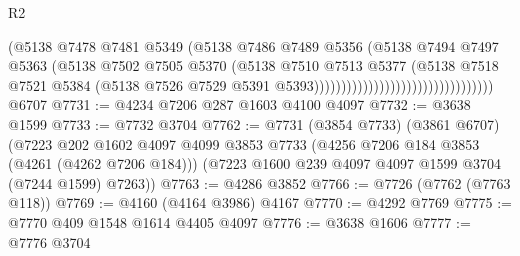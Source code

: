 \begin{lexlean}{R2}
\begin{coremodule}
                                                        (@5138
                                                          @7478
                                                          @7481
                                                          @5349
                                                          (@5138
                                                            @7486
                                                            @7489
                                                            @5356
                                                            (@5138
                                                              @7494
                                                              @7497
                                                              @5363
                                                              (@5138
                                                                @7502
                                                                @7505
                                                                @5370
                                                                (@5138
                                                                  @7510
                                                                  @7513
                                                                  @5377
                                                                  (@5138
                                                                    @7518
                                                                    @7521
                                                                    @5384
                                                                    (@5138
                                                                      @7526
                                                                      @7529
                                                                      @5391
                                                                      @5393)))))))))))))))))))))))))))))))))
    @6707
@7731 := @4234 @7206 @287 @1603 @4100 @4097
@7732 := @3638 @1599
@7733 := @7732 @3704
@7762 := @7731
    (@3854 @7733)
    (@3861 @6707)
    (@7223
      @202
      @1602
      @4097
      @4099
      @3853
      @7733
      (@4256 @7206 @184 @3853 (@4261 (@4262 @7206 @184)))
      (@7223 @1600 @239 @4097 @4097 @1599 @3704 (@7244 @1599) @7263))
@7763 := @4286 @3852
@7766 := @7726 (@7762 (@7763 @118))
@7769 := @4160 (@4164 @3986) @4167
@7770 := @4292 @7769
@7775 := @7770 @409 @1548 @1614 @4405 @4097
@7776 := @3638 @1606
@7777 := @7776 @3704

\end{coremodule}
\end{lexlean}
